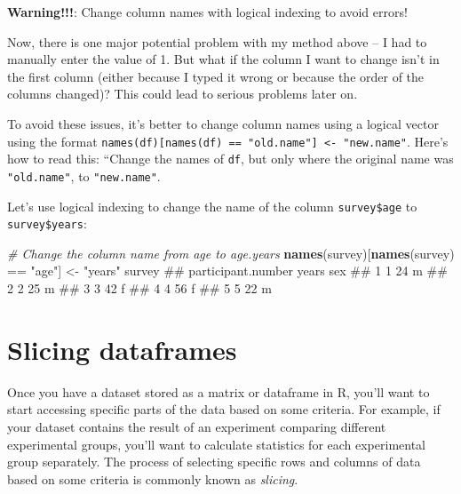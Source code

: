 \documentclass[]{book}
\newenvironment{Shaded}{\begin{snugshade}}{\end{snugshade}}
\newcommand{\KeywordTok}[1]{\textcolor[rgb]{0.13,0.29,0.53}{\textbf{{#1}}}}
\newcommand{\StringTok}[1]{\textcolor[rgb]{0.31,0.60,0.02}{{#1}}}
\newcommand{\CommentTok}[1]{\textcolor[rgb]{0.56,0.35,0.01}{\textit{{#1}}}}
\newcommand{\NormalTok}[1]{{#1}}
\theoremstyle{definition}
\theoremstyle{definition}
\theoremstyle{remark}
\begin{document}
\textbf{Warning!!!}: Change column names with logical indexing to avoid
errors!

Now, there is one major potential problem with my method above -- I had
to manually enter the value of 1. But what if the column I want to
change isn't in the first column (either because I typed it wrong or
because the order of the columns changed)? This could lead to serious
problems later on.

To avoid these issues, it's better to change column names using a
logical vector using the format
\texttt{names(df){[}names(df)\ ==\ "old.name"{]}\ \textless{}-\ "new.name"}.
Here's how to read this: ``Change the names of \texttt{df}, but only
where the original name was \texttt{"old.name"}, to \texttt{"new.name"}.

Let's use logical indexing to change the name of the column
\texttt{survey\$age} to \texttt{survey\$years}:

\begin{Shaded}
\begin{Highlighting}[]
\CommentTok{# Change the column name from age to age.years}
\KeywordTok{names}\NormalTok{(survey)[}\KeywordTok{names}\NormalTok{(survey) ==}\StringTok{ "age"}\NormalTok{] <-}\StringTok{ "years"}
\NormalTok{survey}
\NormalTok{##   participant.number years sex}
\NormalTok{## 1                  1    24   m}
\NormalTok{## 2                  2    25   m}
\NormalTok{## 3                  3    42   f}
\NormalTok{## 4                  4    56   f}
\NormalTok{## 5                  5    22   m}
\end{Highlighting}
\end{Shaded}

\section{Slicing dataframes}\label{slicing-dataframes}

Once you have a dataset stored as a matrix or dataframe in R, you'll
want to start accessing specific parts of the data based on some
criteria. For example, if your dataset contains the result of an
experiment comparing different experimental groups, you'll want to
calculate statistics for each experimental group separately. The process
of selecting specific rows and columns of data based on some criteria is
commonly known as \emph{slicing}.
\end{document}
